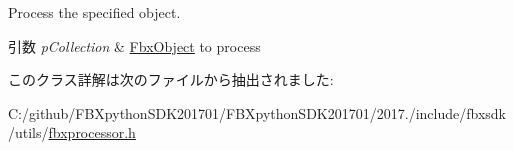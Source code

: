 Process the specified object. 
\begin{DoxyParams}{引数}
{\em p\+Collection} & \hyperlink{class_fbx_object}{Fbx\+Object} to process \\
\hline
\end{DoxyParams}


このクラス詳解は次のファイルから抽出されました\+:\begin{DoxyCompactItemize}
\item 
C\+:/github/\+F\+B\+Xpython\+S\+D\+K201701/\+F\+B\+Xpython\+S\+D\+K201701/2017./include/fbxsdk/utils/\hyperlink{fbxprocessor_8h}{fbxprocessor.\+h}\end{DoxyCompactItemize}
